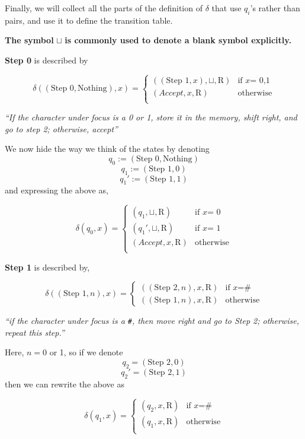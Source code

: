 Finally, we will collect all the parts of the definition of \(\delta\)
that use \(q_i\)'s rather than pairs, and use it to define the
transition table.

\textbf{The symbol} \(\sqcup\) \textbf{is commonly used to denote a
blank symbol explicitly.}

\textbf{Step 0} is described by

\[\delta((\text{Step 0},\text{Nothing}),x) = \begin{cases}
((\text{Step 1}, x),\sqcup ,\mathrm{R}) & \text{if } x \text{= 0,1}\\
(Accept,x, \mathrm{R}) & \text{otherwise}\\
\end{cases}\]

\emph{``If the character under focus is a 0 or 1, store it in the
memory, shift right, and go to step 2; otherwise, accept''}

We now hide the way we think of the states by denoting
\[q_0:=(\text{Step 0}, \text{Nothing})\] \[q_1:=(\text{Step 1}, 0)\]
\[q_1':=(\text{Step 1},1)\] and expressing the above as,

\[\delta(q_0, x) = \begin{cases}
(q_1,\sqcup , \mathrm{R}) & \text{if } x \text{= 0}\\
(q_1',\sqcup , \mathrm{R}) & \text{if } x \text{= 1}\\
(Accept,x, \mathrm{R}) & \text{otherwise}\\
\end{cases}
\]

\textbf{Step 1} is described by,

\[\delta((\text{Step 1}, n), x) = \begin{cases}
((\text{Step 2}, n) ,x, \mathrm{R}) & \text{if } x \text{=} \#\\
((\text{Step 1}, n),x, \mathrm{R}) & \text{otherwise}
\end{cases}
\]

\emph{``if the character under focus is a \texttt{\#}, then move right
and go to Step 2; otherwise, repeat this step.''}

Here, \(n=0\) or 1, so if we denote \[q_2=(\text{Step 2},0)\]
\[q_2'=(\text{Step 2},1)\] then we can rewrite the above as

\[\delta(q_1, x) = \begin{cases}
(q_2 ,x, \mathrm{R}) & \text{if } x \text{=} \#\\
(q_1,x, \mathrm{R}) & \text{otherwise}\\
\end{cases}
\]

